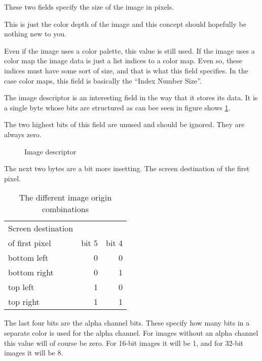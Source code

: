 

  These two fields specify the size of the image in pixels.


  This is just the color depth of the image and this concept should
  hopefully be nothing new to you.

  Even if the image uses a color palette, this value is still used. If
  the image uses a color map the image data is just a list indices to
  a color map. Even so, these indices must have some sort of size, and
  that is what this field specifies. In the case color maps, this
  field is basically the ``Index Number Size''.


  The image descriptor is an interesting field in the way that it
  stores its data. It is a single byte whose bits are structured as
  can bee seen in figure shows \ref{fig:tga-image-desc}.

  The two highest bits of this field are unused and should be
  ignored. They are always zero.

  \begin{figure}[H]
    \centering
    \caption{Image descriptor}
    \label{fig:tga-image-desc}
  \end{figure}

  The next two bytes are a bit more insetting. The screen destination
  of the first pixel.

  \begin{table}
    \centering
    \begin{tabular}{lrr}
      \toprule
      Screen destination \\ of first pixel & bit 5 & bit 4 \\
      \midrule
      bottom left & 0 & 0 \\
      bottom right & 0 & 1 \\
      top left & 1 & 0 \\
      top right & 1 & 1 \\
      \bottomrule
    \end{tabular}
    \caption{The different image origin combinations}
    \label{tab:image-origin}
  \end{table}

  The last four bits are the alpha channel bits. These specify how
  many bits in a separate color is used for the alpha channel. For
  images without an alpha channel this value will of course be
  zero. For 16-bit images it will be 1, and for 32-bit images it will
  be 8.


